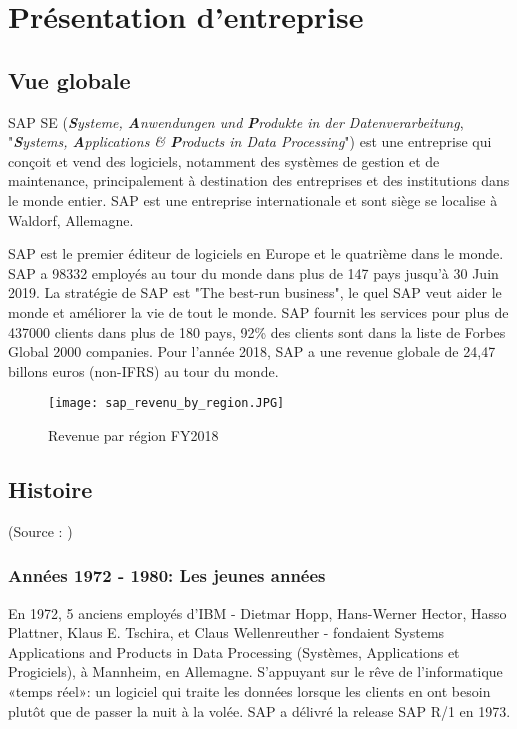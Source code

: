 
\section{Présentation d'entreprise}

\subsection{Vue globale}
    \par SAP SE (\textit{\textbf{S}ysteme, \textbf{A}nwendungen und \textbf{P}rodukte in der Datenverarbeitung}, "\textit{\textbf{S}ystems, \textbf{A}pplications \& \textbf{P}roducts in Data Processing}") est une entreprise qui conçoit et vend des logiciels, notamment des systèmes de gestion et de maintenance, principalement à destination des entreprises et des institutions dans le monde entier. SAP est une entreprise internationale et sont siège se localise à Waldorf, Allemagne.
    
    \par \cite{SAP_Corporate_Fact_Sheet} SAP est le premier éditeur de logiciels en Europe et le quatrième dans le monde. SAP a 98332 employés au tour du monde dans plus de 147 pays jusqu'à 30 Juin 2019. La stratégie de SAP est "The best-run business", le quel SAP veut aider le monde et améliorer la vie de tout le monde. SAP fournit les services pour plus de 437000 clients dans plus de 180 pays, 92\% des clients sont dans la liste de Forbes Global 2000 companies. Pour l'année 2018, SAP a une revenue globale de 24,47 billons euros (non-IFRS) au tour du monde.
    \begin{figure}[H]
        \flushleft
        \texttt{[image: sap\_revenu\_by\_region.JPG]}
        \caption{Revenue par région FY2018}
        \label{fig:revenue_by_region2018_label}
    \end{figure}
    
\newpage    
\subsection{Histoire}
    (Source : \citet{SAP-History})
    \subsubsection{Années 1972 - 1980: Les jeunes années}
    En 1972, 5 anciens employés d'IBM - Dietmar Hopp, Hans-Werner Hector, Hasso Plattner, Klaus E. Tschira, et Claus Wellenreuther - fondaient Systems Applications and Products in Data Processing (Systèmes, Applications et Progiciels), à Mannheim, en Allemagne. S'appuyant sur le rêve de l'informatique «temps réel»: un logiciel qui traite les données lorsque les clients en ont besoin plutôt que de passer la nuit à la volée. SAP a délivré la release SAP R/1 en 1973.


